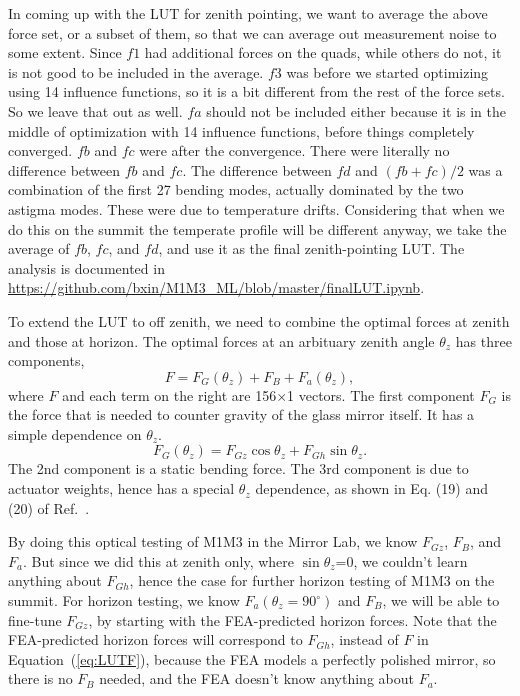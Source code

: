 \documentclass [twoside,openbib,12pt]{article}
\newcommand{\beq}{\begin{equation}}
\newcommand{\eeq}{\end{equation}}
\begin{document}
In coming up with the LUT for zenith pointing, we want to average the
above force set, or a subset of them, so that we can average out
measurement noise to some extent.
Since $f1$ had additional forces on the quads, while others do not, it is not good to be
included in the average.
$f3$ was before we started optimizing using 14 influence functions, so
it is a bit different from the rest of the force sets. So we leave
that out as well.
$fa$ should not be included either because it is in the middle of
optimization with 14 influence functions, before things
completely converged.
$fb$ and $fc$ were after the convergence. There were literally no
difference between $fb$ and $fc$.
The difference between $fd$ and $(fb+fc)/2$ was a combination of the first
27 bending modes, actually dominated by the two astigma modes.
These were due to temperature drifts.
Considering that when we do this on the summit the temperate profile
will be different anyway, we take the average of $fb$, $fc$, and $fd$,
and use it as the final zenith-pointing LUT.
The analysis is documented in \url{https://github.com/bxin/M1M3_ML/blob/master/finalLUT.ipynb}.

To extend the LUT to off zenith, we need to combine the optimal forces
at zenith and those at horizon. The optimal forces at an arbituary
zenith angle $\theta_z$ has three components,
\beq
F = F_G(\theta_z) + F_B + F_a(\theta_z),
\label{eq:LUTF}
\eeq
where $F$ and each term on the right are 156$\times$1 vectors.
The first component $F_G$ is the force that is needed to counter
gravity of the glass mirror itself. It has a simple dependence on $\theta_z$.
\beq
F_G(\theta_z)  = F_{Gz} \cos \theta_z + F_{Gh} \sin \theta_z.
\eeq
The 2nd component is a static bending force.
The 3rd component is due to actuator weights, hence has a special
$\theta_z$ dependence, as shown in Eq. (19) and (20) of Ref.~\cite{m1m3initF}.

By doing this optical testing of M1M3 in the Mirror Lab, we know
$F_{Gz}$, $F_B$, and $F_a$. But since we did this at zenith only,
where $\sin\theta_z$=0, we couldn't learn anything about $F_{Gh}$,
hence the case for further horizon testing of M1M3 on the summit. For
horizon testing, we know $F_a(\theta_z = 90^\circ)$ and $F_B$, we will
be able to fine-tune $F_{Gz}$, by starting with the FEA-predicted
horizon forces. Note that the FEA-predicted horizon forces will
correspond to $F_{Gh} $, instead of $F$ in Equation~(\ref{eq:LUTF}), because the FEA
models a perfectly polished mirror, so there is no $F_B$ needed, and
the FEA doesn't know anything about $F_a$.
\end{document}
